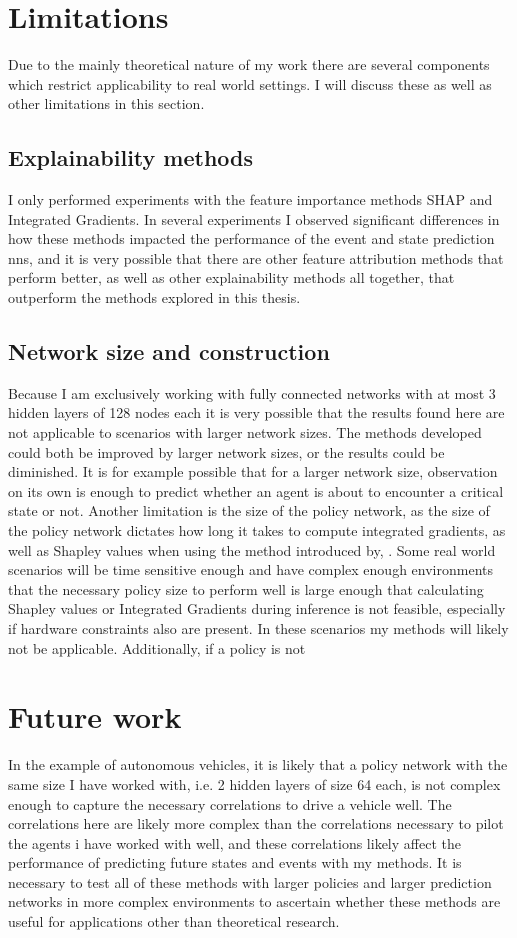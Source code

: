 \documentclass[UKenglish]{uiomasterthesis}
\begin{document}
\section{Limitations}
Due to the mainly theoretical nature of my work there are several components which restrict applicability to real world settings. I will discuss these as well as other limitations in this section.

\subsection{Explainability methods}
I only performed experiments with the feature importance methods SHAP and Integrated Gradients. In several experiments I observed significant differences in how these methods impacted the performance of the event and state prediction \acp{nn}, and it is very possible that there are other feature attribution methods that perform better, as well as other explainability methods all together, that outperform the methods explored in this thesis.

\subsection{Network size and construction}
Because I am exclusively working with fully connected networks with at most 3 hidden layers of 128 nodes each it is very possible that the results found here are not applicable to scenarios with larger network sizes. The methods developed could both be improved by larger network sizes, or the results could be diminished. It is for example possible that for a larger network size, observation on its own is enough to predict whether an agent is about to encounter a critical state or not. 
Another limitation is the size of the policy network, as the size of the policy network dictates how long it takes to compute integrated gradients, as well as Shapley values when using the method introduced by,  . Some real world scenarios will be time sensitive enough and have complex enough environments that the necessary policy size to perform well is large enough that calculating Shapley values or Integrated Gradients during inference is not feasible, especially if hardware constraints also are present. In these scenarios my methods will likely not be applicable.
Additionally, if a policy is not

\section{Future work}
In the example of autonomous vehicles, it is likely that a policy network with the same size I have worked with, i.e. 2 hidden layers of size 64 each, is not complex enough to capture the necessary correlations to drive a vehicle well. The correlations here are likely more complex than the correlations necessary to pilot the agents i have worked with well, and these correlations likely affect the performance of predicting future states and events with my methods. It is necessary to test all of these methods with larger policies and larger prediction networks in more complex environments to ascertain whether these methods are useful for applications other than theoretical research. 
\end{document}
